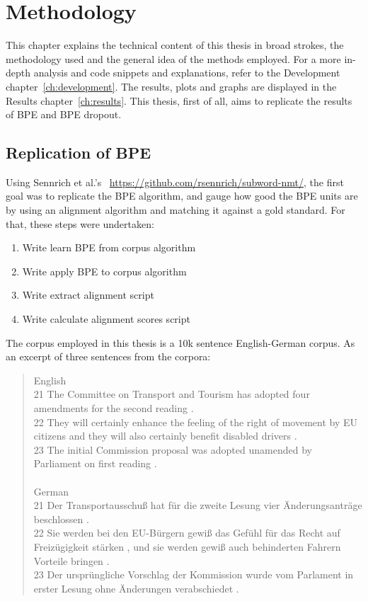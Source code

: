 %
%

\chapter{Methodology}\label{ch:methodology}

This chapter explains the technical content of this thesis in broad strokes, the methodology used and the general idea of the methods employed. For a more in-depth analysis and code snippets and explanations, refer to the Development chapter~\ref{ch:development}. The results, plots and graphs are displayed in the Results chapter~\ref{ch:results}. This thesis, first of all, aims to replicate the results of BPE and BPE dropout.

\section{Replication of BPE}

Using Sennrich et al.'s~\cite{sennrich2015neural} \href{code on Github}{https://github.com/rsennrich/subword-nmt/}, the first goal was to replicate the BPE algorithm, and gauge how good the BPE units are by using an alignment algorithm and matching it against a gold standard. For that, these steps were undertaken:

\begin{enumerate}
	\item Write learn BPE from corpus algorithm
	\item Write apply BPE to corpus algorithm
	\item Write extract alignment script
	\item Write calculate alignment scores script
\end{enumerate}

The corpus employed in this thesis is a 10k sentence English-German corpus. As an excerpt of three sentences from the corpora:

\begin{quote}
	English\\
	21	The Committee on Transport and Tourism has adopted four amendments for the second reading .\\
	22	They will certainly enhance the feeling of the right of movement by EU citizens and they will also certainly benefit disabled drivers .\\
	23	The initial Commission proposal was adopted unamended by Parliament on first reading .\\\\
	German\\
	21	Der Transportausschuß hat für die zweite Lesung vier Änderungsanträge beschlossen .\\
	22	Sie werden bei den EU-Bürgern gewiß das Gefühl für das Recht auf Freizügigkeit stärken , und sie werden gewiß auch behinderten Fahrern Vorteile bringen .\\
	23	Der ursprüngliche Vorschlag der Kommission wurde vom Parlament in erster Lesung ohne Änderungen verabschiedet .
\end{quote}

